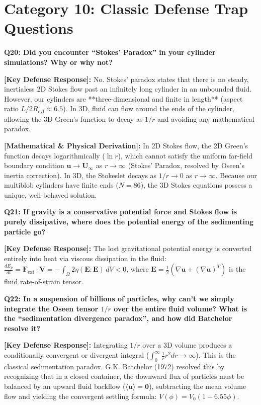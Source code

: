 \documentclass[11pt,a4paper]{article}
\newcommand{\question}[2]{
    \vspace{0.4cm}
    \noindent\colorbox{blue!10}{\parbox{\dimexpr\textwidth-2\fboxsep\relax}{
        \textbf{#1: #2}
    }}
    \vspace{0.2cm}
}
\newcommand{\shortanswer}[1]{
    \noindent\textbf{\textcolor{green!50!black}{[Key Defense Response]:}} #1
    \vspace{0.2cm}
}
\newcommand{\deepdetails}[1]{
    \noindent\textbf{\textcolor{blue!60!black}{[Mathematical \& Physical Derivation]:}} #1
    \vspace{0.2cm}
}
\begin{document}
\section{Category 10: Classic Defense Trap Questions}

\question{Q20}{Did you encounter ``Stokes' Paradox'' in your cylinder simulations? Why or why not?}

\shortanswer{No. Stokes' paradox states that there is no steady, inertialess 2D Stokes flow past an infinitely long cylinder in an unbounded fluid. However, our cylinders are **three-dimensional and finite in length** (aspect ratio $L / 2R_{\text{cyl}} \approx 6.5$). In 3D, fluid can flow around the ends of the cylinder, allowing the 3D Green's function to decay as $1/r$ and avoiding any mathematical paradox.}

\deepdetails{
In 2D Stokes flow, the 2D Green's function decays logarithmically ($\ln r$), which cannot satisfy the uniform far-field boundary condition $\mathbf{u} \to \mathbf{U}_\infty$ as $r \to \infty$ (Stokes' Paradox, resolved by Oseen's inertia correction). In 3D, the Stokeslet decays as $1/r \to 0$ as $r \to \infty$. Because our multiblob cylinders have finite ends ($N = 86$), the 3D Stokes equations possess a unique, well-behaved solution.
}

\vspace{0.4cm}
\question{Q21}{If gravity is a conservative potential force and Stokes flow is purely dissipative, where does the potential energy of the sedimenting particle go?}

\shortanswer{The lost gravitational potential energy is converted entirely into heat via viscous dissipation in the fluid: $\frac{dE_p}{dt} = \mathbf{F}_{\text{ext}} \cdot \mathbf{V} = -\int_{\Omega} 2\eta (\mathbf{E}:\mathbf{E}) \, dV < 0$, where $\mathbf{E} = \frac{1}{2}(\nabla \mathbf{u} + (\nabla \mathbf{u})^T)$ is the fluid rate-of-strain tensor.}

\vspace{0.4cm}
\question{Q22}{In a suspension of billions of particles, why can't we simply integrate the Oseen tensor $1/r$ over the entire fluid volume? What is the ``sedimentation divergence paradox'', and how did Batchelor resolve it?}

\shortanswer{Integrating $1/r$ over a 3D volume produces a conditionally convergent or divergent integral ($\int_0^\infty \frac{1}{r} r^2 dr \to \infty$). This is the classical sedimentation paradox. G.K. Batchelor (1972) resolved this by recognizing that in a closed container, the downward flux of particles must be balanced by an upward fluid backflow ($\langle \mathbf{u} \rangle = \mathbf{0}$), subtracting the mean volume flow and yielding the convergent settling formula: $V(\phi) = V_0 (1 - 6.55 \phi)$.}
\end{document}
